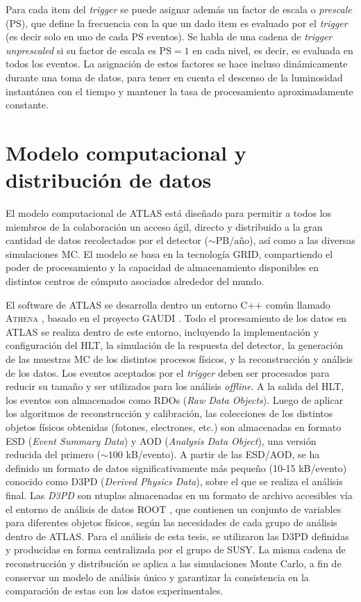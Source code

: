 Para cada item del \emph{trigger} se puede asignar además
un factor de escala o \emph{prescale} (PS), que define la frecuencia con la que un dado
item es evaluado por el \emph{trigger} (es decir solo en uno de cada PS eventos).
Se habla de una cadena de \emph{trigger} \emph{unprescaled} si su factor de escala es
$\text{PS} = 1$ en cada nivel, es decir, es evaluada en todos los eventos. La asignación de estos
factores se hace incluso dinámicamente durante una toma de datos, para tener en
cuenta el descenso de la luminosidad instantánea con el tiempo y mantener la
tasa de procesamiento aproximadamente constante.



\section{Modelo computacional y distribución de datos}

El modelo computacional de ATLAS está diseñado para permitir a todos los
miembros de la colaboración un acceso ágil, directo y distribuido a la gran
cantidad de datos recolectados por el detector ($\sim \text{PB}/\text{a\~no}$),
así como a las diversas simulaciones MC. El modelo se basa en la tecnología
GRID, compartiendo el poder de procesamiento y la capacidad de almacenamiento
disponibles en distintos centros de cómputo asociados alrededor del mundo.

El software de ATLAS se desarrolla dentro un entorno C++ común llamado
\textsc{Athena} \cite{CompuTDR,Lenzi:1214931,Calafiura:865624}, basado en el
proyecto GAUDI \cite{Gaudi}. Todo el procesamiento de los datos en ATLAS se
realiza dentro de este entorno, incluyendo la implementación y configuración del
HLT, la simulación de la respuesta del detector, la generación de las muestras
MC de los distintos procesos físicos, y la reconstrucción y análisis de los
datos. Los eventos aceptados por el \emph{trigger} deben ser procesados para reducir su
tamaño y ser utilizados para los análisis \emph{offline}. A la salida del HLT, los
eventos son almacenados como RDOs (\emph{Raw Data Objects}). Luego de aplicar
los algoritmos de reconstrucción y calibración, las colecciones de los distintos
objetos físicos obtenidas (fotones, electrones, etc.) son almacenadas en formato
ESD (\emph{Event Summary Data}) y AOD (\emph{Analysis Data Object}), una versión
reducida del primero ($\sim 100$ kB/evento). A partir de las ESD/AOD, se ha
definido un formato de datos significativamente más pequeño (10-15 kB/evento)
conocido como D3PD (\emph{Derived Physics Data}), sobre el que se realiza el
análisis final. Las \emph{D3PD} son ntuplas almacenadas en un formato de archivo
accesibles vía el entorno de análisis de datos ROOT \cite{Brun199781}, que
contienen un conjunto de variables para diferentes objetos físicos, según las
necesidades de cada grupo de análisis dentro de ATLAS. Para el análisis de esta
tesis, se utilizaron las D3PD definidas y producidas en forma centralizada por
el grupo de SUSY. La misma cadena de reconstrucción y distribución se aplica a
las simulaciones Monte Carlo, a fin de conservar un modelo de análisis único y
garantizar la consistencia en la comparación de estas con los datos
experimentales.



